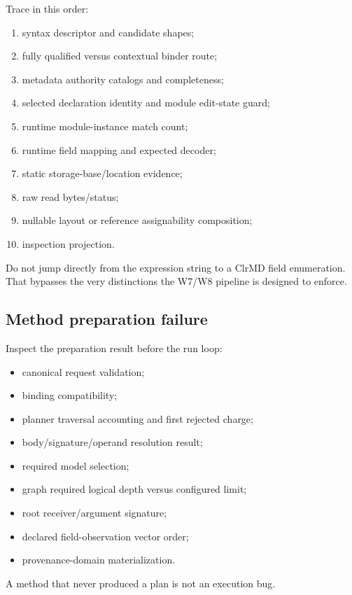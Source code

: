 \documentclass[11pt,oneside,openany]{book}
\begin{document}
Trace in this order:

\begin{enumerate}
  \item syntax descriptor and candidate shapes;
  \item fully qualified versus contextual binder route;
  \item metadata authority catalogs and completeness;
  \item selected declaration identity and module edit-state guard;
  \item runtime module-instance match count;
  \item runtime field mapping and expected decoder;
  \item static storage-base/location evidence;
  \item raw read bytes/status;
  \item nullable layout or reference assignability composition;
  \item inspection projection.
\end{enumerate}

Do not jump directly from the expression string to a ClrMD field enumeration. That bypasses the very distinctions the W7/W8 pipeline is designed to enforce.

\subsection{Method preparation failure}

Inspect the preparation result before the run loop:

\begin{itemize}
  \item canonical request validation;
  \item binding compatibility;
  \item planner traversal accounting and first rejected charge;
  \item body/signature/operand resolution result;
  \item required model selection;
  \item graph required logical depth versus configured limit;
  \item root receiver/argument signature;
  \item declared field-observation vector order;
  \item provenance-domain materialization.
\end{itemize}

A method that never produced a plan is not an execution bug.
\end{document}
